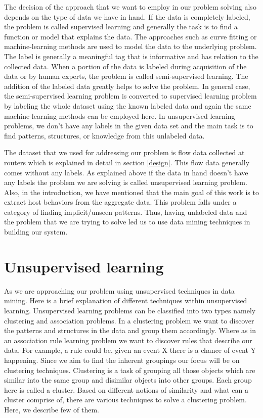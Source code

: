 The decision of the approach that we want to employ in our problem solving also depends on the type of data we have in hand. If the data is completely labeled, the problem is called supervised learning and generally the task is to find a function or model that explains the data. The approaches such as curve fitting or machine-learning methods are used to model the data to the underlying problem. The label is generally a meaningful tag that is informative and has relation to the collected data.  When a portion of the data is labeled during acquisition of the data or by human experts, the problem is called semi-supervised learning. The addition of the labeled data greatly helps to solve the problem. In general case, the semi-supervised learning problem is converted to supervised learning problem by labeling the whole dataset using the known labeled data and again the same machine-learning methods can be employed here. In unsupervised learning problems, we don't have any labels in the given data set and the main task is to find patterns, structures, or knowledge from this unlabeled data.   

The dataset that we used for addressing our problem is flow data collected at routers which is explained in detail in section \ref{design}. This flow data generally comes without any labels. As explained above if the data in hand doesn't have any labels the problem we are solving is called unsupervised learning problem. Also, in the introduction, we have mentioned that the main goal of this work is to extract host behaviors from the aggregate data. This problem falls under a category of finding implicit/unseen patterns. Thus, having unlabeled data and the problem that we are trying to solve led us to use data mining techniques in building our system.

\section{Unsupervised learning}  \label{unsupervised}
As we are approaching our problem using unsupervised techniques in data mining. Here is a brief explanation of different techniques within unsupervised learning. Unsupervised learning problems can be classified into two types namely clustering and association problems. In a clustering problem we want to discover the patterns and structures in the data and group them accordingly. Where as in an association rule learning problem we want to discover rules that describe our data, For example, a rule could be, given an event X there is a chance of event Y happening. Since we aim to find the inherent groupings our focus will be on clustering techniques. Clustering is a task of grouping all those objects which are similar into the same group and disimilar objects into other groups. Each group here is called a cluster. Based on different notions of similarity and what can a cluster comprise of, there are various techniques to solve a clustering problem. Here, we describe few of them.

